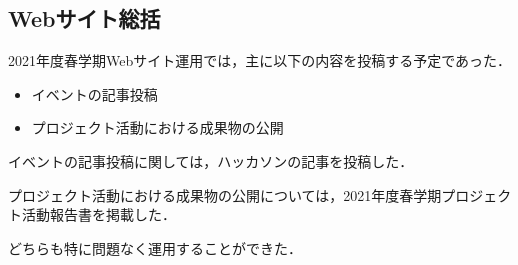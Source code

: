 \subsection*{Webサイト総括}


2021年度春学期Webサイト運用では，主に以下の内容を投稿する予定であった．

\begin{itemize}
\item イベントの記事投稿
\item プロジェクト活動における成果物の公開
\end{itemize}

イベントの記事投稿に関しては，ハッカソンの記事を投稿した．

プロジェクト活動における成果物の公開については，2021年度春学期プロジェクト活動報告書を掲載した．

どちらも特に問題なく運用することができた．